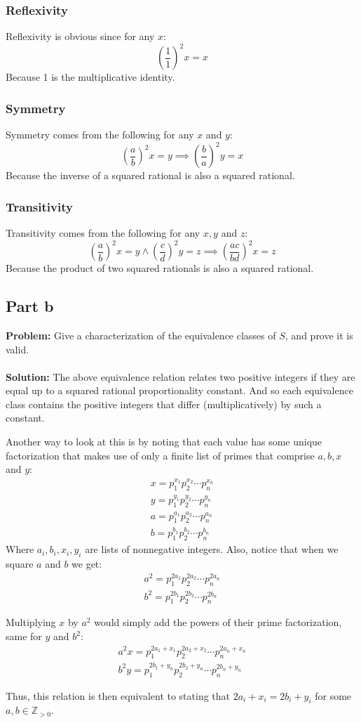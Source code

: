 \documentclass{article}
\begin{document}
\subsubsection*{Reflexivity}
Reflexivity is obvious since for any $x$:
$$\left(\frac{1}{1}\right)^2x=x$$
Because 1 is the multiplicative identity.

\subsubsection*{Symmetry}
Symmetry comes from the following for any $x$ and $y$:
$$\left(\frac{a}{b}\right)^2x=y\implies\left(\frac{b}{a}\right)^2y=x$$
Because the inverse of a squared rational is also a squared rational.

\subsubsection*{Transitivity}
Transitivity comes from the following for any $x,y$ and $z$:
$$\left(\frac{a}{b}\right)^2x=y\wedge \left(\frac{c}{d}\right)^2y=z\implies\left(\frac{ac}{bd}\right)^2x=z$$
Because the product of two squared rationals is also a squared rational.

\subsection*{Part b}
\textbf{Problem:} Give a characterization of the equivalence classes of $S$, and prove it is valid.
\\\\
\textbf{Solution:} The above equivalence relation relates two positive integers if they are equal up to a squared rational proportionality constant. And so each equivalence class contains the positive integers that differ (multiplicatively) by such a constant.

Another way to look at this is by noting that each value has some unique factorization that makes use of only a finite list of primes that comprise $a,b,x$ and $y$:
\begin{gather*}
  x=p_1^{x_1}p_2^{x_2}\cdots p_n^{x_n}\\
  y=p_1^{y_1}p_2^{y_2}\cdots p_n^{y_n}\\
  a=p_1^{a_1}p_2^{a_2}\cdots p_n^{a_n}\\
  b=p_1^{b_1}p_2^{b_2}\cdots p_n^{b_n}
\end{gather*}
Where $a_i,b_i,x_i,y_i$ are lists of nonnegative integers. Also, notice that when we square $a$ and $b$ we get:
\begin{gather*}
  a^2=p_1^{2a_1}p_2^{2a_2}\cdots p_n^{2a_n}\\
  b^2=p_1^{2b_1}p_2^{2b_2}\cdots p_n^{2b_n}
\end{gather*}

Multiplying $x$ by $a^2$ would simply add the powers of their prime factorization, same for $y$ and $b^2$:
\begin{gather*}
  a^2x=p_1^{2a_1+x_1}p_2^{2a_2+x_2}\cdots p_n^{2a_n+x_n}\\
  b^2y=p_1^{2b_1+y_n}p_2^{2b_2+y_n}\cdots p_n^{2b_n+y_n}
\end{gather*}

Thus, this relation is then equivalent to stating that $2a_i+x_i=2b_i+y_i$ for some $a,b\in\mathbb Z_{>0}$.
\end{document}
